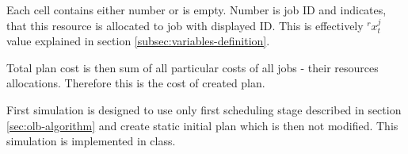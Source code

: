 Each cell contains either number or is empty.
Number is job ID and indicates, that this resource is allocated to job with displayed ID.
This is effectively $^{r}x_{t}^{j}$ value explained in section \ref{subsec:variables-definition}.

Total plan cost is then sum of all particular costs of all jobs - their resources allocations.
Therefore this is the cost of created plan.

First simulation is designed to use only first scheduling stage described in section \ref{sec:olb-algorithm}
and create static initial plan which is then not modified.
This simulation is implemented in  class.
